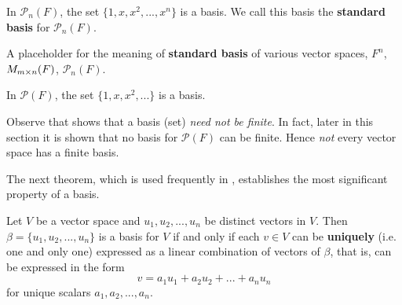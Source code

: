 \begin{example} \label{example 1.6.4}
In \(\mathcal{P}_n(F)\), the set \(\{ 1, x, x^2, ..., x^n \}\) is a basis.
We call this basis the \textbf{standard basis} for \(\mathcal{P}_n(F)\).
\end{example}

\begin{additional definition} \label{adef 1.11}
A placeholder for the meaning of \textbf{standard basis} of various vector spaces, \(F^n\), \(M_{m \times n}(F)\), \(\mathcal{P}_n(F)\).
\end{additional definition}

\begin{example} \label{example 1.6.5}
In \(\mathcal{P}(F)\), the set \(\{1, x, x^2, ... \}\) is a basis.
\end{example}

\begin{remark} \label{remark 1.6.1}
Observe that  shows that a basis (set) \emph{need not be finite}.
In fact, later in this section it is shown that no basis for \(\mathcal{P}(F)\) can be finite.
Hence \emph{not} every vector space has a finite basis.
\end{remark}

The next theorem, which is used frequently in , establishes the most significant property of a basis.

\begin{theorem} \label{thm 1.8}
Let \(V\) be a vector space and \(u_1, u_2, ..., u_n\) be distinct vectors in \(V\).
Then \(\beta = \{ u_1, u_2, ..., u_n \}\) is a basis for \(V\) if and only if each \(v \in V\) can be \textbf{uniquely} (i.e. one and only one) expressed as a linear combination of vectors of \(\beta\), that is, can be expressed in the form
\[
    v = a_1 u_1 + a_2 u_2 + ... + a_n u_n
\]
for unique scalars \(a_1, a_2, ..., a_n\).
\end{theorem}

